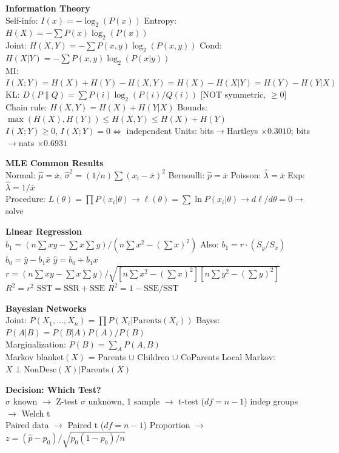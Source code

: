 \documentclass[11pt, letterpaper]{article}
\begin{document}
\begin{cheatbox}
\small
\textbf{Information Theory}\\
Self-info: $I(x) = -\log_2(P(x))$ \quad Entropy: $H(X) = -\sum P(x) \log_2(P(x))$\\
Joint: $H(X,Y) = -\sum P(x,y) \log_2(P(x,y))$ \quad Cond: $H(X|Y) = -\sum P(x,y) \log_2(P(x|y))$\\
MI: $I(X;Y) = H(X) + H(Y) - H(X,Y) = H(X) - H(X|Y) = H(Y) - H(Y|X)$\\
KL: $D(P\|Q) = \sum P(i) \log_2(P(i)/Q(i))$ [NOT symmetric, $\geq 0$]\\
Chain rule: $H(X,Y) = H(X) + H(Y|X)$ \quad Bounds: $\max(H(X),H(Y)) \leq H(X,Y) \leq H(X)+H(Y)$\\
$I(X;Y) \geq 0$, $I(X;Y) = 0 \iff$ independent \quad Units: bits$\to$Hartleys $\times 0.3010$; bits$\to$nats $\times 0.6931$

\medskip
\textbf{MLE Common Results}\\
Normal: $\hat{\mu}=\bar{x}$, $\hat{\sigma}^2 = (1/n)\sum(x_i - \bar{x})^2$ \quad Bernoulli: $\hat{p}=\bar{x}$ \quad Poisson: $\hat{\lambda}=\bar{x}$ \quad Exp: $\hat{\lambda}=1/\bar{x}$\\
Procedure: $L(\theta)=\prod P(x_i|\theta) \to \ell(\theta)=\sum\ln P(x_i|\theta) \to d\ell/d\theta=0 \to$ solve

\medskip
\textbf{Linear Regression}\\
$b_1 = (n\sum xy - \sum x \sum y)/(n\sum x^2 - (\sum x)^2)$ \quad Also: $b_1 = r \cdot (S_y/S_x)$\\
$b_0 = \bar{y} - b_1\bar{x}$ \quad $\hat{y} = b_0 + b_1 x$\\
$r = (n\sum xy - \sum x \sum y)/\sqrt{[n\sum x^2 - (\sum x)^2][n\sum y^2 - (\sum y)^2]}$\\
$R^2 = r^2$ \quad $\text{SST} = \text{SSR} + \text{SSE}$ \quad $R^2 = 1 - \text{SSE}/\text{SST}$

\medskip
\textbf{Bayesian Networks}\\
Joint: $P(X_1,\ldots,X_n) = \prod P(X_i|\text{Parents}(X_i))$ \quad Bayes: $P(A|B) = P(B|A)P(A)/P(B)$\\
Marginalization: $P(B) = \sum_A P(A,B)$\\
Markov blanket$(X)$ = Parents $\cup$ Children $\cup$ CoParents \quad Local Markov: $X \perp \text{NonDesc}(X) | \text{Parents}(X)$

\medskip
\textbf{Decision: Which Test?}\\
$\sigma$ known $\to$ Z-test \quad $\sigma$ unknown, 1 sample $\to$ t-test ($df=n{-}1$)  indep groups $\to$ Welch t\\
Paired data $\to$ Paired t ($df=n{-}1$) \quad Proportion $\to$ $z = (\hat{p}-p_0)/\sqrt{p_0(1-p_0)/n}$


\end{cheatbox}
\end{document}

